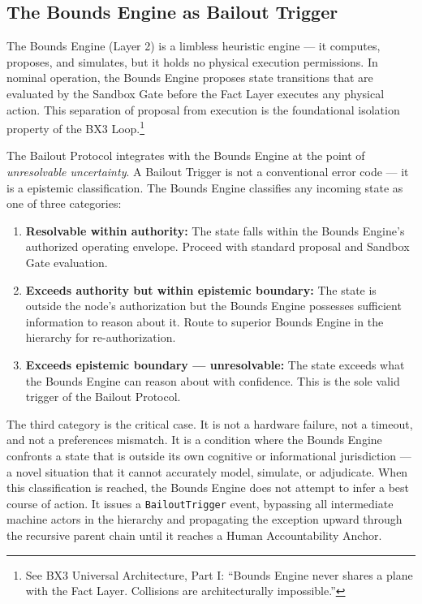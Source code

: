 \subsection{The Bounds Engine as Bailout Trigger}

The Bounds Engine (Layer 2) is a limbless heuristic engine --- it computes, proposes, and simulates, but it holds no physical execution permissions. In nominal operation, the Bounds Engine proposes state transitions that are evaluated by the Sandbox Gate before the Fact Layer executes any physical action. This separation of proposal from execution is the foundational isolation property of the BX3 Loop.\footnote{See BX3 Universal Architecture, Part I: ``Bounds Engine never shares a plane with the Fact Layer. Collisions are architecturally impossible.''}

The Bailout Protocol integrates with the Bounds Engine at the point of \emph{unresolvable uncertainty}. A Bailout Trigger is not a conventional error code --- it is a epistemic classification. The Bounds Engine classifies any incoming state as one of three categories:

\begin{enumerate}
    \item \textbf{Resolvable within authority:} The state falls within the Bounds Engine's authorized operating envelope. Proceed with standard proposal and Sandbox Gate evaluation.
    \item \textbf{Exceeds authority but within epistemic boundary:} The state is outside the node's authorization but the Bounds Engine possesses sufficient information to reason about it. Route to superior Bounds Engine in the hierarchy for re-authorization.
    \item \textbf{Exceeds epistemic boundary --- unresolvable:} The state exceeds what the Bounds Engine can reason about with confidence. This is the sole valid trigger of the Bailout Protocol.
\end{enumerate}

The third category is the critical case. It is not a hardware failure, not a timeout, and not a preferences mismatch. It is a condition where the Bounds Engine confronts a state that is outside its own cognitive or informational jurisdiction --- a novel situation that it cannot accurately model, simulate, or adjudicate. When this classification is reached, the Bounds Engine does not attempt to infer a best course of action. It issues a \texttt{BailoutTrigger} event, bypassing all intermediate machine actors in the hierarchy and propagating the exception upward through the recursive parent chain until it reaches a Human Accountability Anchor.

